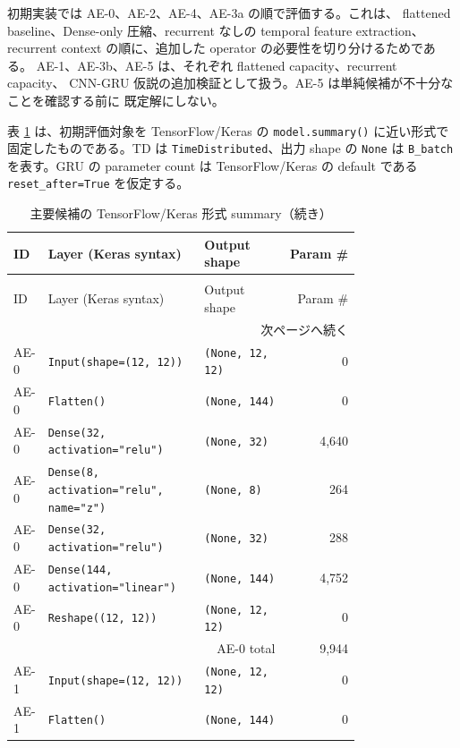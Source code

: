 初期実装では AE-0、AE-2、AE-4、AE-3a の順で評価する。これは、
flattened baseline、Dense-only 圧縮、recurrent なしの temporal feature extraction、
recurrent context の順に、追加した operator の必要性を切り分けるためである。
AE-1、AE-3b、AE-5 は、それぞれ flattened capacity、recurrent capacity、
CNN-GRU 仮説の追加検証として扱う。AE-5 は単純候補が不十分なことを確認する前に
既定解にしない。

表 \ref{tab:model-details} は、初期評価対象を TensorFlow/Keras の
\texttt{model.summary()} に近い形式で固定したものである。TD は
\texttt{TimeDistributed}、出力 shape の \texttt{None} は
\texttt{B\_batch} を表す。GRU の parameter count は TensorFlow/Keras の
default である \texttt{reset\_after=True} を仮定する。

\small
\setlength{\tabcolsep}{3pt}
\begin{longtable}{@{}p{0.08\linewidth}p{0.45\linewidth}p{0.24\linewidth}r@{}}
  \caption{主要候補の TensorFlow/Keras 形式 summary}
  \label{tab:model-details} \\
  \toprule
  ID & Layer (Keras syntax) & Output shape & Param \# \\
  \midrule
  \endfirsthead
  \caption[]{主要候補の TensorFlow/Keras 形式 summary（続き）} \\
  \toprule
  ID & Layer (Keras syntax) & Output shape & Param \# \\
  \midrule
  \endhead
  \midrule
  \multicolumn{4}{r}{次ページへ続く} \\
  \endfoot
  \bottomrule
  \endlastfoot
  AE-0 & \texttt{Input(shape=(12, 12))} & \texttt{(None, 12, 12)} & 0 \\
  AE-0 & \texttt{Flatten()} & \texttt{(None, 144)} & 0 \\
  AE-0 & \texttt{Dense(32, activation="relu")} & \texttt{(None, 32)} & 4,640 \\
  AE-0 & \texttt{Dense(8, activation="relu", name="z")} & \texttt{(None, 8)} & 264 \\
  AE-0 & \texttt{Dense(32, activation="relu")} & \texttt{(None, 32)} & 288 \\
  AE-0 & \texttt{Dense(144, activation="linear")} & \texttt{(None, 144)} & 4,752 \\
  AE-0 & \texttt{Reshape((12, 12))} & \texttt{(None, 12, 12)} & 0 \\
  \multicolumn{3}{r}{AE-0 total} & 9,944 \\
  \midrule
  AE-1 & \texttt{Input(shape=(12, 12))} & \texttt{(None, 12, 12)} & 0 \\
  AE-1 & \texttt{Flatten()} & \texttt{(None, 144)} & 0 \\

\end{longtable}
